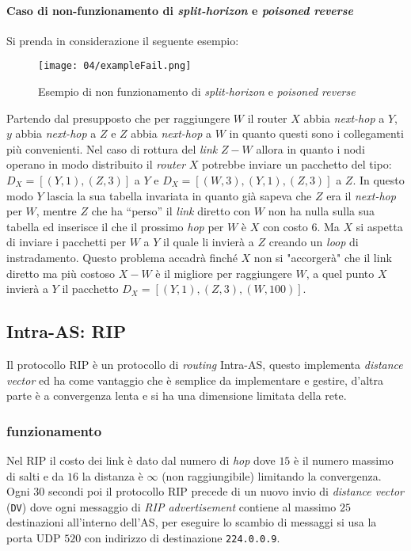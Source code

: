         \paragraph{Caso di non-funzionamento di \textit{split-horizon} e \textit{poisoned reverse}}
        Si prenda in considerazione il seguente esempio:
            \begin{figure}[H]
                \centering
                \texttt{[image: 04/exampleFail.png]}
                \caption{Esempio di non funzionamento di \textit{split-horizon} e \textit{poisoned reverse}}
            \end{figure}
        
        Partendo dal presupposto che per raggiungere $W$ il router $X$ abbia \textit{next-hop} a $Y$, $y$ abbia \textit{next-hop} a $Z$ e $Z$ abbia \textit{next-hop} a $W$ in quanto questi sono i collegamenti più convenienti.\newline
        Nel caso di rottura del \textit{link} $Z-W$ allora in quanto i nodi operano in modo distribuito il \textit{router} $X$ potrebbe inviare un pacchetto del tipo: $D_X=[(Y,1),(Z,3)]$ a $Y$ e $D_X=[(W,3),(Y,1),(Z,3)]$ a $Z$. In questo modo $Y$ lascia la sua tabella invariata in quanto già sapeva che $Z$ era il \textit{next-hop} per $W$, mentre $Z$ che ha ``perso'' il \textit{link} diretto con $W$ non ha nulla sulla sua tabella ed inserisce il che il prossimo \textit{hop} per $W$ è $X$ con costo $6$. Ma $X$ si aspetta di inviare i pacchetti per $W$ a $Y$ il quale li invierà a $Z$ creando un \textit{loop} di instradamento. Questo problema accadrà finché $X$ non si "accorgerà" che il link diretto ma più costoso $X-W$ è il migliore per raggiungere $W$, a quel punto $X$ invierà a $Y$ il pacchetto $D_X=[(Y,1),(Z,3),(W,100)]$. 
    \subsection[Intra-\texttt{AS}: \textit{Routing Information Protocol} (\texttt{RIP})]{Intra-\Acrshort*{AS}: \acrfull*{RIP}}
        Il protocollo \Acrshort*{RIP} è un protocollo di \textit{routing} Intra-\Acrshort*{AS}, questo implementa \textit{distance vector} ed ha come vantaggio che è semplice da implementare e gestire, d'altra parte è a convergenza lenta e si ha una dimensione limitata della rete.
        \subsubsection{funzionamento} Nel \Acrshort*{RIP} il costo dei link è dato dal numero di \textit{hop} dove $15$ è il numero massimo di salti e da $16$ la distanza è $\infty$ (non raggiungibile) limitando la convergenza. Ogni $30$ secondi poi il protocollo \Acrshort*{RIP} precede di un nuovo invio di \textit{distance vector} (\texttt{DV}) dove ogni messaggio di \textit{\Acrshort*{RIP} advertisement} contiene al massimo $25$ destinazioni all'interno dell'\Acrshort*{AS}, per eseguire lo scambio di messaggi si usa la porta \Acrshort*{UDP} $520$ con indirizzo di destinazione \texttt{224.0.0.9}.
